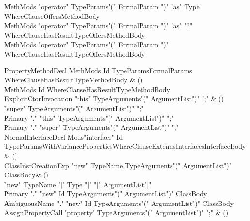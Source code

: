 \begin{bbgrammar}
    \| MethMods \xcd"operator" TypeParams\opt \xcd"(" FormalParam  \xcd")" \xcd"as" Type WhereClause\opt Offers\opt MethodBody\\
    \| MethMods \xcd"operator" TypeParams\opt \xcd"(" FormalParam  \xcd")" \xcd"as" \xcd"?" WhereClause\opt HasResultType\opt Offers\opt MethodBody\\
    \| MethMods \xcd"operator" TypeParams\opt \xcd"(" FormalParam  \xcd")" WhereClause\opt HasResultType\opt Offers\opt MethodBody\\
\end{bbgrammar}

\begin{bbgrammar}

 PropertyMethodDecl  \label{prod:PropertyMethodDecl}  \: MethMods Id TypeParams\opt FormalParams WhereClause\opt HasResultType\opt MethodBody & ()\\
    \| MethMods Id WhereClause\opt HasResultType\opt MethodBody\\
 ExplicitCtorInvocation  \label{prod:ExplicitCtorInvocation}  \: \xcd"this" TypeArguments\opt \xcd"(" ArgumentList\opt \xcd")" \xcd";" & ()\\
    \| \xcd"super" TypeArguments\opt \xcd"(" ArgumentList\opt \xcd")" \xcd";"\\
    \| Primary \xcd"." \xcd"this" TypeArguments\opt \xcd"(" ArgumentList\opt \xcd")" \xcd";"\\
    \| Primary \xcd"." \xcd"super" TypeArguments\opt \xcd"(" ArgumentList\opt \xcd")" \xcd";"\\
 NormalInterfaceDecl  \label{prod:NormalInterfaceDecl}  \: Mods\opt \xcd"interface" Id TypeParamsWithVariance\opt Properties\opt WhereClause\opt ExtendsInterfaces\opt InterfaceBody & ()\\
 ClassInstCreationExp  \label{prod:ClassInstCreationExp}  \: \xcd"new" TypeName TypeArguments\opt \xcd"(" ArgumentList\opt \xcd")" ClassBody\opt & ()\\
    \| \xcd"new" TypeName \xcd"[" Type \xcd"]" \xcd"[" ArgumentList\opt \xcd"]"\\
    \| Primary \xcd"." \xcd"new" Id TypeArguments\opt \xcd"(" ArgumentList\opt \xcd")" ClassBody\opt\\
    \| AmbiguousName \xcd"." \xcd"new" Id TypeArguments\opt \xcd"(" ArgumentList\opt \xcd")" ClassBody\opt\\
 AssignPropertyCall  \label{prod:AssignPropertyCall}  \: \xcd"property" TypeArguments\opt \xcd"(" ArgumentList\opt \xcd")" \xcd";" & ()\\

\end{bbgrammar}
